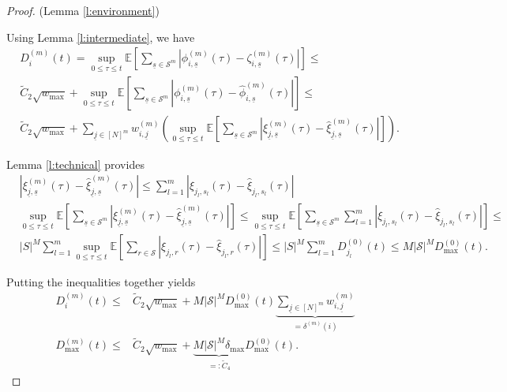 \documentclass{article}
\newcommand{\E}{\mathbb{E}}
\newcommand{\1}[1]{{\mathds{1}}_{\left\{#1\right\}}}
\renewcommand{\S}{\mathcal{S}}
\begin{document}
	\begin{proof}(Lemma \ref{l:environment})
		
		Using Lemma \ref{l:intermediate}, we have
		\begin{align*}
			&D_{i}^{(m)}(t)=\sup_{0 \leq \tau \leq t}\E \left[ \sum_{\underline{s} \in \S^m} \left|\phi_{i, \underline{s}}^{(m)}(\tau)-\zeta_{i,\underline{s}}^{(m)}(\tau) \right| \right] \leq\\
			& \tilde{C}_2 \sqrt{w_{\max}}+\sup_{0 \leq \tau \leq t}\E \left[ \sum_{\underline{s} \in \S^m} \left|\phi_{i, \underline{s}}^{(m)}(\tau)-\hat{\phi}_{i,\underline{s}}^{(m)}(\tau) \right| \right] \leq \\
			&\tilde{C}_2 \sqrt{w_{\max}}+\sum_{\underline{j} \in [N]^m}w_{i,\underline{j}}^{(m)}\left(\sup_{0 \leq \tau \leq t}\E \left[ \sum_{\underline{s} \in \S^m} \left|\xi_{\underline{j}, \underline{s}}^{(m)}(\tau)-\hat{\xi}_{\underline{j},\underline{s}}^{(m)}(\tau) \right| \right] \right).
		\end{align*}
		
		Lemma \ref{l:technical} provides
		\begin{align*}
			&\left|\xi_{\underline{j}, \underline{s}}^{(m)}(\tau)-\hat{\xi}_{\underline{j},\underline{s}}^{(m)}(\tau) \right| \leq \sum_{l=1}^{m} \left|\xi_{j_l,s_l}(\tau)-\hat{\xi}_{j_l,s_l}(\tau) \right| \\
			&\sup_{0 \leq \tau \leq t}\E \left[ \sum_{\underline{s} \in \S^m} \left|\xi_{\underline{j}, \underline{s}}^{(m)}(\tau)-\hat{\xi}_{\underline{j},\underline{s}}^{(m)}(\tau) \right| \right] \leq \sup_{0 \leq \tau \leq t}\E \left[ \sum_{\underline{s} \in \S^m} \sum_{l=1}^{m} \left|\xi_{j_l,s_l}(\tau)-\hat{\xi}_{j_l,s_l}(\tau) \right| \right] \leq\\
			& \left|S \right|^M \sum_{l=1}^{m} \sup_{0 \leq \tau \leq t } \E \left[\sum_{r \in \S} \left|\xi_{j_l,r}(\tau)-\hat{\xi}_{j_l,r}(\tau) \right| \right] \leq \left|S \right|^M \sum_{l=1}^{m} D_{j_l}^{(0)}(t) \leq M \left|\S \right|^M D_{\max}^{(0)}(t).
		\end{align*}
		
		Putting the inequalities together yields
		\begin{align*}
			D_{i}^{(m)}(t) \leq& \tilde{C}_2 \sqrt{w_{\max}}+M \left|\S \right|^M D_{\max}^{(0)}(t) \underbrace{\sum_{\underline{j} \in [N]^m}w_{i,\underline{j}}^{(m)}}_{=\delta^{(m)}(i) } \\
			D_{\max}^{(m)}(t) \leq& \tilde{C}_2 \sqrt{w_{\max}}+\underbrace{M \left|\S \right|^M \delta_{\max}}_{=:\tilde{C}_4} D_{\max}^{(0)}(t).
		\end{align*}
		

\end{proof}
\end{document}
